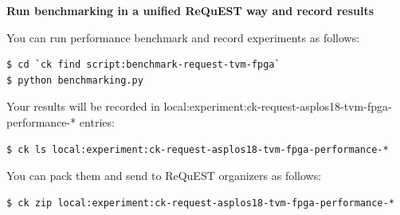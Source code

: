 \documentclass[sigconf]{acmart}
\begin{document}
\textbf{Run benchmarking in a unified ReQuEST way and record results}

You can run performance benchmark and record experiments as follows:

\begin{verbatim}
$ cd `ck find script:benchmark-request-tvm-fpga`
$ python benchmarking.py
\end{verbatim}

Your results will be recorded in local:experiment:ck-request-asplos18-tvm-fpga-performance-* entries:
\begin{verbatim}
$ ck ls local:experiment:ck-request-asplos18-tvm-fpga-performance-*
\end{verbatim}

You can pack them and send to ReQuEST organizers as follows:

\begin{verbatim}
$ ck zip local:experiment:ck-request-asplos18-tvm-fpga-performance-*
\end{verbatim}
\end{document}
